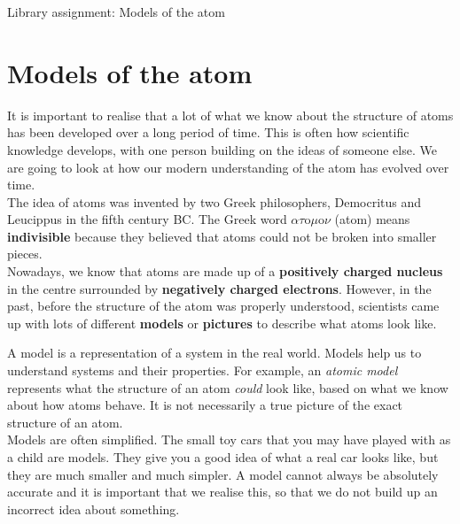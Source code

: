\begin{project}{Library assignment: Models of the atom}
\begin{minipage}{.4\textwidth}
\end{minipage}

\end{project}

            \section{Models of the atom}
            \nopagebreak
      \label{m38756*id254164}It is important to realise that a lot of what we know about the structure of atoms has been developed over a long period of time. This is often how scientific knowledge develops, with one person building on the ideas of someone else. We are going to look at how our modern understanding of the atom has evolved over time.\\ 
      \label{m38756*id254508}The idea of atoms was invented by two Greek philosophers, Democritus and Leucippus in the fifth century BC. The Greek word $\alpha \tau \text{o}\mu \text{o}\nu$ (atom) means \textbf{indivisible} because they believed that atoms could not be broken into smaller pieces.\\ 
      \label{m38756*id254540}Nowadays, we know that atoms are made up of a \textbf{positively charged nucleus} in the centre
surrounded by \textbf{negatively charged electrons}. However, in the past, before the structure of the atom was properly understood, scientists came up with lots of different \textbf{models} or \textbf{pictures} to describe what atoms look like. 

 {\vspace{-.5cm} A model is a representation of a system in the real world. Models help us to understand systems and their properties.} 
 For example, an \textsl{atomic model} represents what the structure of an atom \textsl{could} look like, based on what we know about how atoms behave. It is not necessarily a true picture of the exact structure of an atom. \\
Models are often simplified. The small toy cars that you may have played with as a child are models. They give you a good idea of what a real car looks like, but they are much smaller and much simpler. A model cannot always be absolutely accurate and it is important that we realise this, so that we do not build up an incorrect idea about something. 
